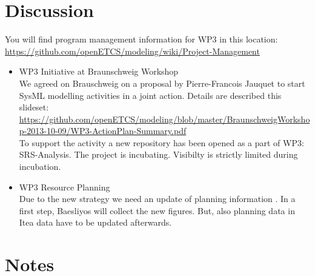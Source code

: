\documentclass[a4paper, 11pt]{article}
\begin{document}
\section{Discussion}
You will find program management information for WP3 in this location:
\url{https://github.com/openETCS/modeling/wiki/Project-Management}
\begin{itemize}
\item WP3 Initiative at Braunschweig Workshop\\
We agreed on Brauschweig on a proposal by Pierre-Francois Jauquet to start SysML modelling activities in a joint action. Details are described this slideset: \url{https://github.com/openETCS/modeling/blob/master/BraunschweigWorkshop-2013-10-09/WP3-ActionPlan-Summary.pdf}\\
To support the activity a new repository has been opened as a part of WP3: SRS-Analysis. The project is incubating.  Visibilty is strictly limited during incubation.


\item WP3 Resource Planning\\
Due to the new strategy we need an update of planning information . In a first step, Baesliyos will collect the new figures. But, also planning data in Itea data have to be updated afterwards.

\end{itemize}


\section{Notes}
\end{document}
